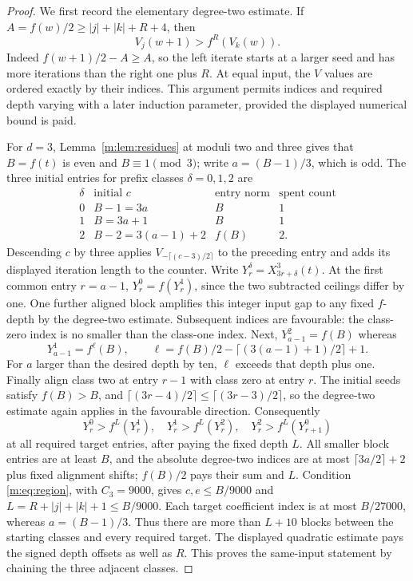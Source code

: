 \begin{proof}
We first record the elementary degree-two estimate. If
$A=f(w)/2\ge |j|+|k|+R+4$, then
\[
 V_j(w+1)>f^R(V_k(w)).
\]
Indeed $f(w+1)/2-A\ge A$, so the left iterate starts at a larger seed and
has more iterations than the right one plus $R$. At equal input, the $V$
values are ordered exactly by their indices. This argument permits indices
and required depth varying with a later induction parameter, provided the
displayed numerical bound is paid.

For $d=3$, Lemma~\ref{m:lem:residues} at moduli two and three gives
that $B=f(t)$ is even and $B\equiv1\pmod3$; write
$a=(B-1)/3$, which is odd. The three initial entries for prefix classes
$\delta=0,1,2$ are
\[
\begin{array}{c|ccc}
\delta&\text{initial }c&\text{entry norm}&\text{spent count}\\ \hline
0&B-1=3a&B&1\\
1&B=3a+1&B&1\\
2&B-2=3(a-1)+2&f(B)&2.
\end{array}
\]
Descending $c$ by three applies $V_{-\lceil(c-3)/2\rceil}$ to the preceding
entry and adds its displayed iteration length to the counter. Write
$Y^\delta_r=X^3_{3r+\delta}(t)$. At the first common entry $r=a-1$,
$Y^0_r=f(Y^1_r)$, since the two subtracted ceilings differ by one. One
further aligned block amplifies this integer input gap to any fixed
$f$-depth by the degree-two estimate. Subsequent indices are favourable:
the class-zero index is no smaller than the class-one index. Next,
$Y^2_{a-1}=f(B)$ whereas
\[
 Y^1_{a-1}=f^\ell(B),\qquad
 \ell=f(B)/2-\lceil(3(a-1)+1)/2\rceil+1.
\]
For $a$ larger than the desired depth by ten, $\ell$ exceeds that depth
plus one. Finally align class two at entry $r-1$ with class zero at entry
$r$. The initial seeds satisfy $f(B)>B$, and
$\lceil(3r-4)/2\rceil\le\lceil(3r-3)/2\rceil$, so the degree-two
estimate again applies in the favourable direction. Consequently
\[
 Y^0_r>f^L(Y^1_r),\quad
 Y^1_r>f^L(Y^2_r),\quad
 Y^2_r>f^L(Y^0_{r+1})
\]
at all required target entries, after paying the fixed depth $L$.
All smaller block entries are at least $B$, and the absolute degree-two
indices are at most $\lceil3a/2\rceil+2$ plus fixed alignment shifts;
$f(B)/2$ pays their sum and $L$. Condition \eqref{m:eq:region}, with
$C_3=9000$, gives $c,e\le B/9000$ and
$L=R+|j|+|k|+1\le B/9000$.  Each target coefficient index is at
most $B/27000$, whereas $a=(B-1)/3$.  Thus there are more than
$L+10$ blocks between the starting classes and every required target.
The displayed quadratic estimate pays the signed depth offsets as well
as $R$.  This proves the same-input statement by chaining the three
adjacent classes.


\end{proof}
